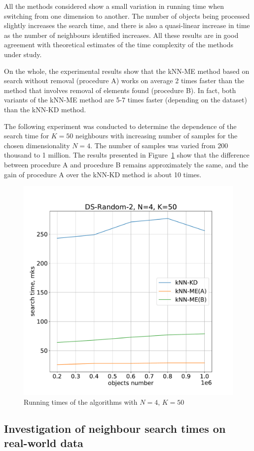 \documentclass[entropy,article,submit,moreauthors,pdftex]{Definitions/mdpi}
\begin{document}
\begin{paracol}{2}
All the methods considered show a small variation in running time when switching from one dimension to another. The number of objects being processed slightly increases the search time, and there is also a quasi-linear increase in time as the number of neighbours identified increases. All these results are in good agreement with theoretical estimates of the time complexity of the methods under study.

On the whole, the experimental results show that the kNN-ME method based on search without removal (procedure A) works on average 2 times faster than the method that involves removal of elements found (procedure B). In fact, both variants of the kNN-ME method are 5-7 times faster (depending on the dataset) than the kNN-KD method.

\textcolor[rgb]{1,0,0}{The following experiment was conducted to determine the dependence of the search time for $K = 50$ neighbours with increasing number of samples for the chosen dimensionality $N = 4$. The number of samples was varied from 200 thousand to 1 million. The results presented in Figure~\ref{figN} show that the difference between procedure A and procedure B remains approximately the same, and the gain of procedure A over the kNN-KD method is about 10 times.}

\begin{figure}
\widefigure
\includegraphics[width=0.5\linewidth]{figN.pdf}
\caption{Running times of the algorithms with $N = 4$, $K = 50$\label{figN}}
\end{figure}  


\subsection{Investigation of neighbour search times on real-world data}\label{RealData}


\end{paracol}
\end{document}
